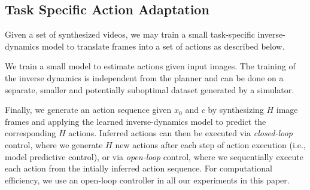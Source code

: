\subsection{Task Specific Action Adaptation}

Given a set of synthesized %
videos,
we may train a small task-specific inverse-dynamics model to translate frames into a set of actions as described below.

 We train a small model to estimate actions given input images. The training of the inverse dynamics is independent from the planner and can be done on a separate, smaller and potentially suboptimal dataset generated by a simulator.

Finally, we generate an action sequence given $x_0$ and $c$ by synthesizing $H$ image frames and applying the learned inverse-dynamics model to predict the corresponding $H$ actions.
Inferred actions can then be executed via \emph{closed-loop} control,
where we generate $H$ new actions after each step of action execution (i.e., model predictive control), 
or via \emph{open-loop} control, where we sequentially execute each action from the intially inferred action sequence. 
For computational efficiency, we use an open-loop controller in all our experiments in this paper.

